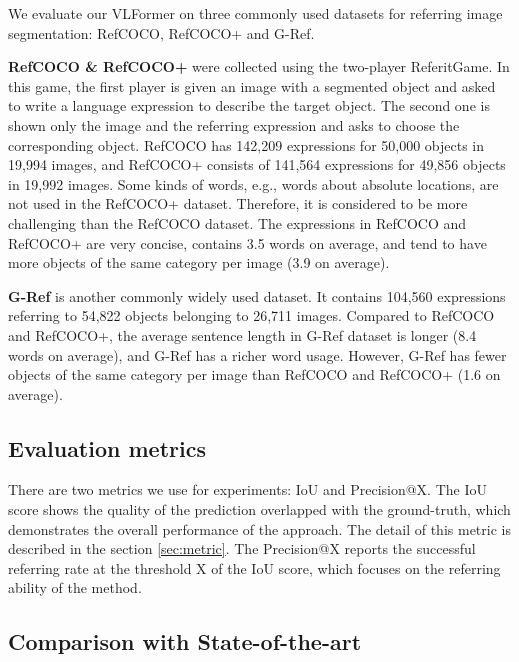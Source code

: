 We evaluate our VLFormer on three commonly used datasets for referring image segmentation: RefCOCO, RefCOCO+ and G-Ref.

\textbf{RefCOCO \& RefCOCO+} were collected using the two-player  ReferitGame. In this game, the first player is given an image with a segmented object and asked to write a language expression to describe the target object. The second one is shown only the image and the referring expression and asks to choose the corresponding object. 
RefCOCO has 142,209 expressions for 50,000 objects in 19,994 images, and RefCOCO+ consists of 141,564 expressions for 49,856 objects in 19,992 images. Some kinds of words, e.g., words about absolute locations, are not used in the RefCOCO+ dataset. Therefore, it is considered to be more challenging than the RefCOCO dataset. The expressions in RefCOCO and RefCOCO+ are very concise, contains 3.5 words on average, and tend to have more objects of the same category per image (3.9 on average).

\textbf{G-Ref} is another commonly widely used dataset. It contains 104,560 expressions referring to 54,822 objects belonging to 26,711 images. Compared to RefCOCO and RefCOCO+, the average sentence length in G-Ref dataset is longer (8.4 words on average), and G-Ref has a richer word usage. However, G-Ref has fewer objects of the same category per image than RefCOCO and RefCOCO+ (1.6 on average).

\subsection{Evaluation metrics}
There are two metrics we use for experiments: IoU and Precision@X. The IoU score shows the quality of the prediction overlapped with the ground-truth, which demonstrates the overall performance of the approach. The detail of this metric is described in the section \ref{sec:metric}. The Precision@X reports the successful referring rate at the threshold X of the IoU score, which focuses on the referring ability of the method.


\subsection{Comparison with State-of-the-art}


